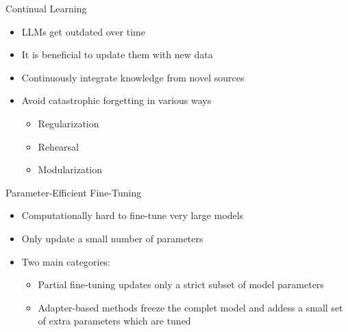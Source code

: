 
\begin{vbframe}{Continual Learning}

\vfill

\begin{itemize}
\item LLMs get outdated over time
\item It is beneficial to update them with new data
\item Continuously integrate knowledge from novel sources
\item Avoid catastrophic forgetting in various ways
    \begin{itemize}
    \item Regularization
    \item Rehearsal
    \item Modularization
    \end{itemize}
\end{itemize}

\vfill

\end{vbframe}


\begin{vbframe}{Parameter-Efficient Fine-Tuning}

\vfill

\begin{itemize}
\item Computationally hard to fine-tune very large models
\item Only update a small number of parameters
\item Two main categories:
    \begin{itemize}
    \item Partial fine-tuning updates only a strict subset of model parameters
    \item Adapter-based methods freeze the complet model and addess a small set of extra parameters which are tuned
    \end{itemize}
\end{itemize}

\vfill

\end{vbframe}


